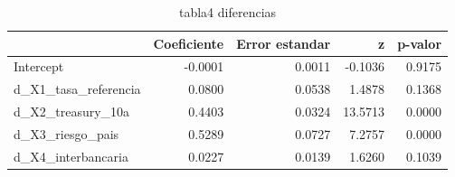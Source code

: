 \begin{table}
\caption{tabla4 diferencias}
\begin{tabular}{lrrrr}
\toprule
 & Coeficiente & Error estandar & z & p-valor \\
\midrule
Intercept & -0.0001 & 0.0011 & -0.1036 & 0.9175 \\
d_X1_tasa_referencia & 0.0800 & 0.0538 & 1.4878 & 0.1368 \\
d_X2_treasury_10a & 0.4403 & 0.0324 & 13.5713 & 0.0000 \\
d_X3_riesgo_pais & 0.5289 & 0.0727 & 7.2757 & 0.0000 \\
d_X4_interbancaria & 0.0227 & 0.0139 & 1.6260 & 0.1039 \\
\bottomrule
\end{tabular}
\end{table}
